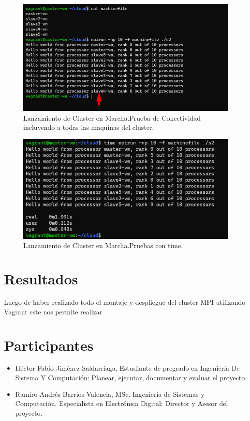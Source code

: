 \documentclass[letterpaper, 12pt, oneside]{article}
\begin{document}
     \begin{figure}[H] \centering
            \includegraphics[scale=1.3]{img/provision/version1fin4.png}
            \caption{Lanzamiento de Cluster en Marcha.Prueba de Conectividad incluyendo a todas las maquinas del cluster.}
            \label{fig:checkcluster2}
    \end{figure}
    
     \begin{figure}[H] \centering
            \includegraphics[scale=1.4]{img/provision/version1fin5.png}
            \caption{Lanzamiento de Cluster en Marcha.Pruebas con time.}
            \label{fig:checkcluster2}
    \end{figure}
    
    \clearpage
    \section{Resultados}
    Luego de haber realizado todo el montaje y despliegue del cluster MPI utilizando Vagrant este nos permite realizar 
    
    \clearpage
    
    \section{Participantes}
    \begin{itemize}
        \item Héctor Fabio Jiménez Saldarriaga, Estudiante de pregrado en Ingeniería De Sistema Y Computación: Planear, ejecutar, documentar y evaluar el proyecto.
        \item Ramiro Andrés Barrios Valencia, MSc. Ingeniería de Sistemas y Computación, Especialista en Electrónica Digital: Director y Asesor del proyecto.
    \end{itemize}
    
\end{document}
